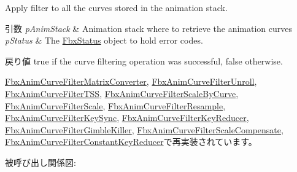Apply filter to all the curves stored in the animation stack. 
\begin{DoxyParams}{引数}
{\em p\+Anim\+Stack} & Animation stack where to retrieve the animation curves \\
\hline
{\em p\+Status} & The \hyperlink{class_fbx_status}{Fbx\+Status} object to hold error codes. \\
\hline
\end{DoxyParams}
\begin{DoxyReturn}{戻り値}
{\ttfamily true} if the curve filtering operation was successful, {\ttfamily false} otherwise. 
\end{DoxyReturn}


\hyperlink{class_fbx_anim_curve_filter_matrix_converter_a20db5fcf27096c750a9b5bfc1ed074e4}{Fbx\+Anim\+Curve\+Filter\+Matrix\+Converter}, \hyperlink{class_fbx_anim_curve_filter_unroll_ae9b4807d576e93ae4800c1764f2aabda}{Fbx\+Anim\+Curve\+Filter\+Unroll}, \hyperlink{class_fbx_anim_curve_filter_t_s_s_a7c301b85f939c3614d998f18e7a20f21}{Fbx\+Anim\+Curve\+Filter\+T\+SS}, \hyperlink{class_fbx_anim_curve_filter_scale_by_curve_a6a1c172a82c4e5e2263d388c74ec9dba}{Fbx\+Anim\+Curve\+Filter\+Scale\+By\+Curve}, \hyperlink{class_fbx_anim_curve_filter_scale_ac6fb7610299bd0fc1e399418f8d17b90}{Fbx\+Anim\+Curve\+Filter\+Scale}, \hyperlink{class_fbx_anim_curve_filter_resample_a0f94e6a08f94ee1798b3bdce67285f53}{Fbx\+Anim\+Curve\+Filter\+Resample}, \hyperlink{class_fbx_anim_curve_filter_key_sync_a4eb3dd7372f7747bcae1be8722db75e0}{Fbx\+Anim\+Curve\+Filter\+Key\+Sync}, \hyperlink{class_fbx_anim_curve_filter_key_reducer_ace307ff2d9d99bf845ddaa26649fb136}{Fbx\+Anim\+Curve\+Filter\+Key\+Reducer}, \hyperlink{class_fbx_anim_curve_filter_gimble_killer_acee7b2b1c995cc079152b5ff8c96bfff}{Fbx\+Anim\+Curve\+Filter\+Gimble\+Killer}, \hyperlink{class_fbx_anim_curve_filter_scale_compensate_a79f0dd5ea9c83ab4fe1088c63c572133}{Fbx\+Anim\+Curve\+Filter\+Scale\+Compensate}, \hyperlink{class_fbx_anim_curve_filter_constant_key_reducer_a723169c1dc3a2d9557eb03908055c277}{Fbx\+Anim\+Curve\+Filter\+Constant\+Key\+Reducer}で再実装されています。

被呼び出し関係図\+:
\mbox{\label{class_fbx_anim_curve_filter_a009498a65af4995bf5e5908f17837531}} 
